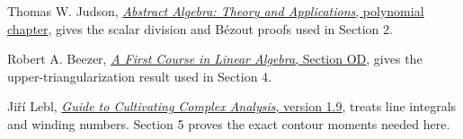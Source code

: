 \documentclass[
  11pt,
]{article}
\begin{document}
Thomas W. Judson,
\href{https://github.com/twjudson/aata/blob/3069910e3ded72ff5e18837a97a0e810c92790e2/src/poly.xml}{\emph{Abstract
Algebra: Theory and Applications}, polynomial chapter}, gives the scalar
division and Bézout proofs used in Section 2.

Robert A. Beezer,
\href{https://github.com/rbeezer/fcla/blob/347f27fe909b54b26970bcc0fcbf69c7e853c766/src/section-OD.xml}{\emph{A
First Course in Linear Algebra}, Section OD}, gives the
upper-triangularization result used in Section 4.

Jiří Lebl,
\href{https://github.com/jirilebl/ca/blob/adfaaf8b13287185c22db079f16f39183628f482/ca.tex}{\emph{Guide
to Cultivating Complex Analysis}, version 1.9}, treats line integrals
and winding numbers. Section 5 proves the exact contour moments needed
here.
\end{document}
